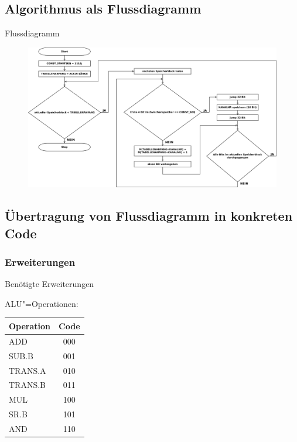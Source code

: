 \documentclass{beamer}
\begin{document}
\subsection{Algorithmus als Flussdiagramm}



\begin{frame}{Flussdiagramm}

\begin{figure}
    \includegraphics[width=\textwidth]{res/algorithmus.pdf}
\end{figure}

\end{frame}



\subsection{Übertragung von Flussdiagramm in konkreten Code}



\subsubsection{Erweiterungen}



\begin{frame}{Benötigte Erweiterungen}

\begin{block}{ALU"=Operationen:}
    \begin{center}
        \begin{tabular}{lc}
            Operation & Code \\
            \hline
            ADD       & 000 \\
            SUB.B     & 001 \\
            TRANS.A   & 010 \\
            TRANS.B   & 011 \\
            MUL       & 100 \\
            SR.B      & 101 \\
            AND       & 110 \\
        \end{tabular}
    \end{center}
\end{block}

\end{frame}
\end{document}
